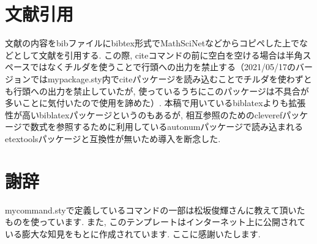 \documentclass[11pt,a4paper,oneside,lualatex]{ltjsarticle} %
\numberwithin{equation}{section} %
\begin{document}
%


\section{文献引用} \label{sec:bib}


文献の内容をbibファイルにbibtex形式でMathSciNetなどからコピペした上で\cite[定理 1.1]{AM}などとして文献を引用する.
この際, citeコマンドの前に空白を空ける場合は半角スペースではなくチルダを使うことで行頭への出力を禁止する（2021/05/17のバージョンではmypackage.sty内でciteパッケージを読み込むことでチルダを使わずとも行頭への出力を禁止していたが, 使っているうちにこのパッケージは不具合が多いことに気付いたので使用を諦めた）.
本稿で用いているbiblatexよりも拡張性が高いbiblatexパッケージというのもあるが, 相互参照のためのcleverefパッケージで数式を参照するために利用しているautonumパッケージで読み込まれるetextoolsパッケージと互換性が無いため導入を断念した. 


\section*{謝辞}


mycommand.styで定義しているコマンドの一部は松坂俊輝さんに教えて頂いたものを使っています.
また, このテンプレートはインターネット上に公開されている膨大な知見をもとに作成されています.
ここに感謝いたします.




\end{document}
